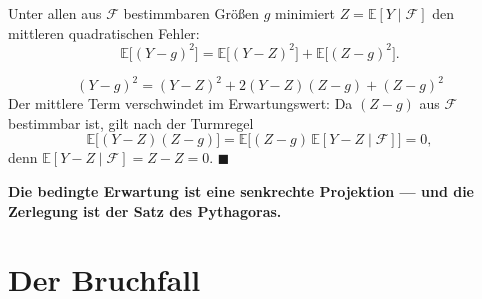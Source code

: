 \begin{merksatz}
Unter allen aus $\mathcal F$ bestimmbaren Größen $g$ minimiert $Z = \mathbb{E}[Y\mid\mathcal F]$ den mittleren quadratischen Fehler:
\[ \mathbb{E}\bigl[(Y-g)^{2}\bigr] = \mathbb{E}\bigl[(Y-Z)^{2}\bigr] + \mathbb{E}\bigl[(Z-g)^{2}\bigr] . \]

\[ (Y-g)^{2} = (Y-Z)^{2} + 2(Y-Z)(Z-g) + (Z-g)^{2} \]
Der mittlere Term verschwindet im Erwartungswert: Da $(Z-g)$ aus $\mathcal F$ bestimmbar ist, gilt nach der Turmregel
\[ \mathbb{E}\bigl[(Y-Z)(Z-g)\bigr] = \mathbb{E}\bigl[(Z-g)\,\mathbb{E}[Y-Z\mid\mathcal F]\bigr] = 0 , \]
denn $\mathbb{E}[Y-Z\mid\mathcal F] = Z - Z = 0$. $\blacksquare$

\begin{center}
\begin{minipage}{0.9\textwidth}
\textbf{Die bedingte Erwartung ist eine senkrechte Projektion --- und die Zerlegung ist der Satz des Pythagoras.}
\end{minipage}
\end{center}

\begin{center}
\begin{minipage}{0.88\textwidth}
\end{minipage}
\end{center}
\end{merksatz}

\section{Der Bruchfall}

